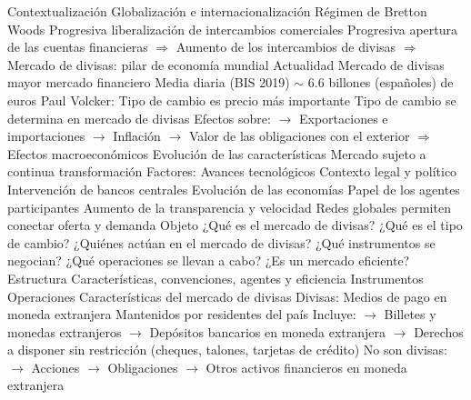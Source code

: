 \documentclass{nuevotema}
\begin{document}
\esquemalargo



















\begin{esquemal}
	\1[] 
		\2 Contextualización
			\3 Globalización e internacionalización
				\4 Régimen de Bretton Woods
				\4[] Progresiva liberalización de intercambios comerciales
				\4[] Progresiva apertura de las cuentas financieras
				\4[] $\Rightarrow$ Aumento de los intercambios de divisas
				\4[] $\Rightarrow$ Mercado de divisas: pilar de economía mundial
			\3 Actualidad
				\4 Mercado de divisas mayor mercado financiero
				\4 Media diaria (BIS 2019)
				\4[] $\sim$ 6.6 billones (españoles) de euros
				\4 Paul Volcker:
				\4[] Tipo de cambio es precio más importante
				\4 Tipo de cambio se determina en mercado de divisas
				\4[] Efectos sobre:
				\4[] $\to$ Exportaciones e importaciones
				\4[] $\to$ Inflación
				\4[] $\to$ Valor de las obligaciones con el exterior
				\4[] $\Rightarrow$ Efectos macroeconómicos
			\3 Evolución de las características
				\4 Mercado sujeto a continua transformación
				\4 Factores:
				\4[] Avances tecnológicos
				\4[] Contexto legal y político
				\4[] Intervención de bancos centrales
				\4[] Evolución de las economías
				\4[] Papel de los agentes participantes
				\4 Aumento de la transparencia y velocidad
				\4[] Redes globales permiten conectar oferta y demanda
		\2 Objeto
			\3 ¿Qué es el mercado de divisas?
			\3 ¿Qué es el tipo de cambio?
			\3 ¿Quiénes actúan en el mercado de divisas?
			\3 ¿Qué instrumentos se negocian?
			\3 ¿Qué operaciones se llevan a cabo?
			\3 ¿Es un mercado eficiente?
		\2 Estructura
			\3 Características, convenciones, agentes y eficiencia
			\3 Instrumentos
			\3 Operaciones
	\1 
		\2 Características del mercado de divisas
			\3 Divisas:
				\4 Medios de pago en moneda extranjera
				\4 Mantenidos por residentes del país
				\4 Incluye:
				\4[] $\to$ Billetes y monedas extranjeros
				\4[] $\to$ Depósitos bancarios en moneda extranjera
				\4[] $\to$ Derechos a disponer sin restricción (cheques, talones, tarjetas de crédito)
				\4[] No son divisas:
				\4[] $\to$ Acciones
				\4[] $\to$ Obligaciones
				\4[] $\to$ Otros activos financieros en moneda extranjera

\end{esquemal}
\end{document}

